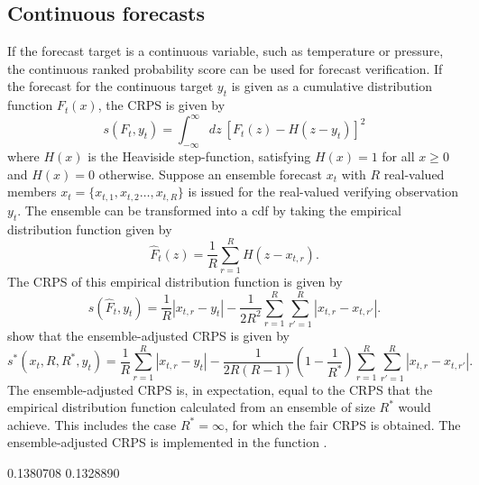 \documentclass[article]{jss}
\begin{document}
\subsection{Continuous forecasts}


If the forecast target is a continuous variable, such as temperature or pressure, the continuous ranked probability score \citep{matheson1976scoring} can be used for forecast verification.
If the forecast for the continuous target $y_t$ is given as a cumulative distribution function $F_t(x)$, the CRPS is given by 
%
\begin{equation}
s(F_t, y_t) = \int_{-\infty}^\infty dz\ \left[F_t(z) - H(z-y_t)\right]^2
\end{equation}
%
where $H(x)$ is the Heaviside step-function, satisfying $H(x)=1$ for all $x\ge 0$ and $H(x)=0$ otherwise.
Suppose an ensemble forecast $x_t$ with $R$ real-valued members $x_t = \{x_{t,1}, x_{t,2} \dots, x_{t,R}\}$ is issued for the real-valued verifying observation $y_t$.
The ensemble can be transformed into a cdf by taking the empirical distribution function given by 
%
\begin{equation}
\hat{F}_t(z) = \frac{1}{R} \sum_{r=1}^{R} H(z - x_{t,r}).
\end{equation}
%
The CRPS of this empirical distribution function is given by
%
\begin{equation}
s(\hat{F}_t, y_t) = \frac{1}{R}|x_{t,r}-y_t| - \frac{1}{2R^2} \sum_{r=1}^R \sum_{r'=1}^R |x_{t,r}-x_{t,r'}|.
\end{equation}
%
\citet{fricker2013three} show that the ensemble-adjusted CRPS is given by
%
\begin{equation}
s^*(x_t, R, R^*, y_t) = \frac{1}{R}\sum_{r=1}^R |x_{t,r} - y_t| - \frac{1}{2R(R-1)}\left(1-\frac{1}{R^*}\right) \sum_{r=1}^R\sum_{r'=1}^R |x_{t,r}-x_{t,r'}|.
\end{equation}
%
The ensemble-adjusted CRPS is, in expectation, equal to the CRPS that the empirical distribution function calculated from an ensemble of size $R^*$ would achieve.
This includes the case $R^*=\infty$, for which the fair CRPS is obtained.
The ensemble-adjusted CRPS is implemented in the  function .

\begin{Schunk}
\begin{Soutput}
[1] 0.1380708 0.1328890
\end{Soutput}
\end{Schunk}
\end{document}
